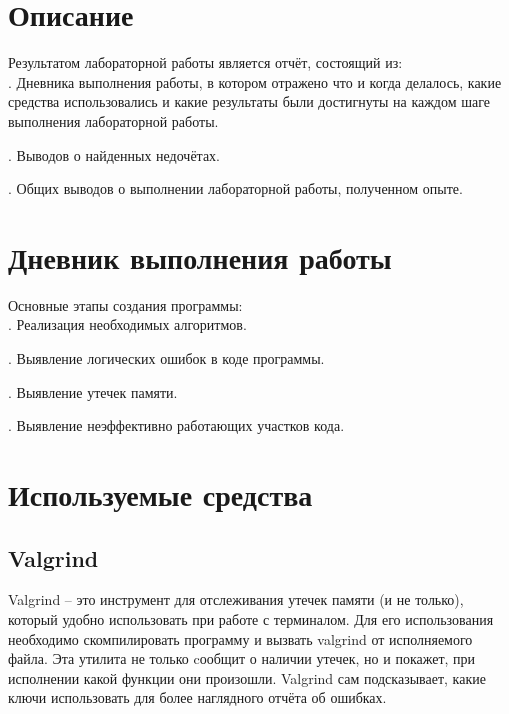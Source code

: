 \section{Описание}

Результатом лабораторной работы является отчёт, состоящий из:\\


    . Дневника выполнения работы, в котором отражено что и когда делалось, какие средства использовались и какие результаты были достигнуты на каждом шаге выполнения лабораторной работы.
\newline

    . Выводов о найденных недочётах.
\newline

    . Общих выводов о выполнении лабораторной работы, полученном опыте.


\section{Дневник выполнения работы}


Основные этапы создания программы:\\


    . Реализация необходимых алгоритмов.
\newline

    . Выявление логических ошибок в коде программы.
\newline

    . Выявление утечек памяти.
\newline

    . Выявление неэффективно работающих участков кода.

\section{Используемые средства}

\subsection{Valgrind}

Valgrind – это инструмент для отслеживания утечек памяти (и не только), который удобно использовать при работе с терминалом. Для его использования необходимо скомпилировать программу и вызвать valgrind от исполняемого файла. Эта утилита не только cообщит о наличии утечек, но и покажет, при исполнении какой функции они произошли. Valgrind сам подсказывает, какие ключи использовать для более наглядного отчёта об ошибках.


